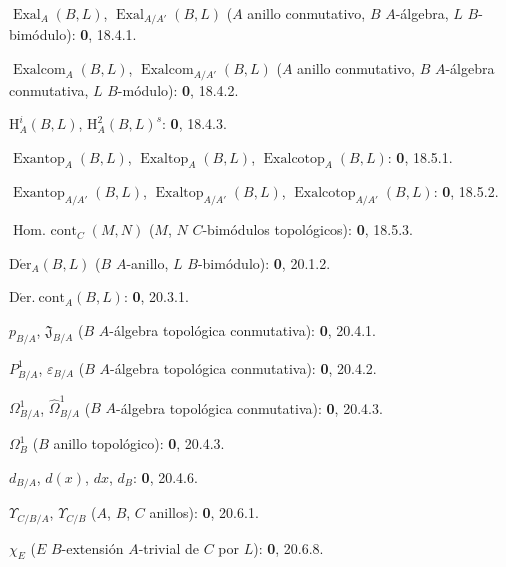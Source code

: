 $\operatorname{Exal}_A(B,L)$, $\operatorname{Exal}_{A/A'}(B,L)$ ($A$ anillo conmutativo, $B$ $A$-álgebra, $L$ $B$-bimódulo): \textbf{0}, 18.4.1.\par
$\operatorname{Exalcom}_A(B,L)$, $\operatorname{Exalcom}_{A/A'}(B,L)$ ($A$ anillo conmutativo, $B$ $A$-álgebra conmutativa, $L$ $B$-módulo): \textbf{0}, 18.4.2.\par
$\mathrm H_A^i(B,L)$, $\mathrm H_A^2(B,L)^s$: \textbf{0}, 18.4.3.\par
$\operatorname{Exantop}_A(B,L)$, $\operatorname{Exaltop}_A(B,L)$,
$\operatorname{Exalcotop}_A(B,L)$: \textbf{0}, 18.5.1.\par
$\operatorname{Exantop}_{A/A'}(B,L)$, $\operatorname{Exaltop}_{A/A'}(B,L)$,
$\operatorname{Exalcotop}_{A/A'}(B,L)$: \textbf{0}, 18.5.2.\par
$\operatorname{Hom.\ cont}_C(M,N)$ ($M$, $N$ $C$-bimódulos topológicos): \textbf{0}, 18.5.3.\par
$\operatorname{D\acute{e}r}_A(B,L)$ ($B$ $A$-anillo, $L$ $B$-bimódulo): \textbf{0}, 20.1.2.\par
$\operatorname{D\acute{e}r.\ cont}_A(B,L)$: \textbf{0}, 20.3.1.\par
$p_{B/A}$, $\mathfrak J_{B/A}$ ($B$ $A$-álgebra topológica conmutativa): \textbf{0}, 20.4.1.\par
$P^1_{B/A}$, $\varepsilon_{B/A}$ ($B$ $A$-álgebra topológica conmutativa): \textbf{0}, 20.4.2.\par
$\Omega^1_{B/A}$, $\widehat{\Omega}^1_{B/A}$ ($B$ $A$-álgebra topológica conmutativa): \textbf{0}, 20.4.3.\par
$\Omega^1_B$ ($B$ anillo topológico): \textbf{0}, 20.4.3.\par
$d_{B/A}$, $d(x)$, $dx$, $d_B$: \textbf{0}, 20.4.6.\par
$\Upsilon_{C/B/A}$, $\Upsilon_{C/B}$ ($A$, $B$, $C$ anillos): \textbf{0}, 20.6.1.\par
$\chi_E$ ($E$ $B$-extensión $A$-trivial de $C$ por $L$): \textbf{0}, 20.6.8.\par

